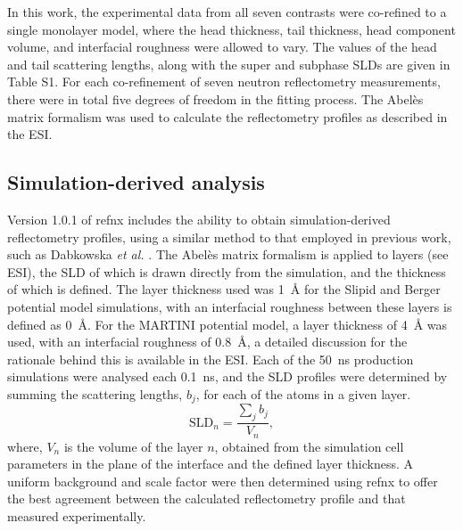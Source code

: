 \documentclass[amsmath,amssymb,twocolumn,superscriptaddress]{revtex4-1}
\begin{document}
In this work, the experimental data from all seven contrasts were co-refined
to a single monolayer model, where the head thickness, tail thickness, head
component volume, and interfacial roughness were allowed to vary.
The values of the head and tail scattering lengths, along with the super and
subphase SLDs are given in Table S1.
For each co-refinement of seven neutron reflectometry measurements, there
were in total five degrees of freedom in the fitting process.
The Abel\`{e}s matrix formalism was used to calculate the reflectometry
profiles as described in the ESI.

\subsection{Simulation-derived analysis}
Version 1.0.1 of refnx \cite{nelson_refnx_2019,nelson_refnx_2018} includes
the ability to obtain simulation-derived reflectometry profiles, using a
similar method to that employed in previous work, such as
Dabkowska \emph{et al.} \cite{dabkowska_modulation_2014}.
The Abel\`{e}s matrix formalism is applied to layers (see ESI), the SLD of
which is drawn directly from the simulation, and the thickness of which is
defined.
The layer thickness used was \SI{1}{\angstrom} for the Slipid and Berger
potential model simulations, with an interfacial roughness between these
layers is defined as \SI{0}{\angstrom}.
For the MARTINI potential model, a layer thickness of \SI{4}{\angstrom} was
used, with an interfacial roughness of \SI{0.8}{\angstrom}, a detailed
discussion for the rationale behind this is available in the ESI.
Each of the \SI{50}{\nano\second} production simulations were analysed each
\SI{0.1}{\nano\second}, and the SLD profiles were determined by summing the
scattering lengths, $b_j$, for each of the atoms in a given layer.
%
\begin{equation}
  \text{SLD}_n = \frac{\sum_j{b_j}}{V_n},
\end{equation}
%
where, $V_n$ is the volume of the layer $n$, obtained from the simulation
cell parameters in the plane of the interface and the defined layer thickness.
A uniform background and scale factor were then determined using refnx to
offer the best agreement between the calculated reflectometry profile and
that measured experimentally.
\end{document}
